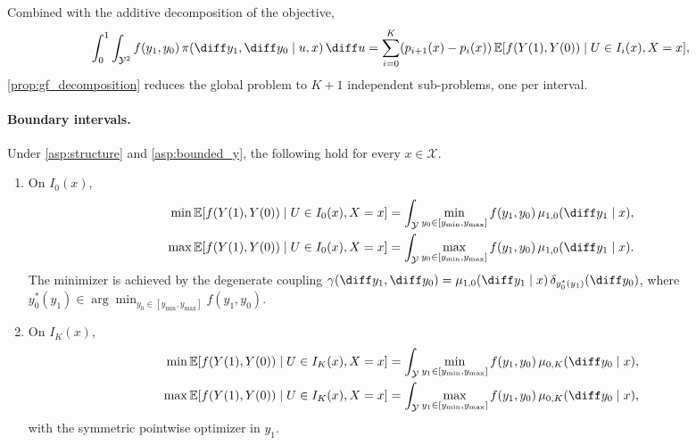 Combined with the additive decomposition of the objective,
\begin{equation}\label{eq:gf_obj_decomp}
    \int_0^1 \int_{\mathcal{Y}^2} f(y_1, y_0)\, \pi(\diff y_1, \diff y_0 \mid u, x)\, \diff u = \sum_{i=0}^{K} (p_{i+1}(x) - p_i(x))\, \mathbb{E}[f(Y(1), Y(0)) \mid U \in I_i(x), X = x],
\end{equation}
\cref{prop:gf_decomposition} reduces the global problem to $K + 1$ independent sub-problems, one per interval.

\paragraph{Boundary intervals.}

\begin{lemma}\label{lem:gf_boundary}
    Under \cref{asp:structure} and \cref{asp:bounded_y}, the following hold for every $x \in \mathcal{X}$.
    \begin{enumerate}
        \item[\textup{(i)}] On $I_0(x)$,
        \begin{align*}
            \min \mathbb{E}[f(Y(1), Y(0)) \mid U \in I_0(x), X = x]
                &= \int_{\mathcal{Y}} \min_{y_0 \in [y_{\min}, y_{\max}]} f(y_1, y_0)\, \mu_{1,0}(\diff y_1 \mid x),\\
            \max \mathbb{E}[f(Y(1), Y(0)) \mid U \in I_0(x), X = x]
                &= \int_{\mathcal{Y}} \max_{y_0 \in [y_{\min}, y_{\max}]} f(y_1, y_0)\, \mu_{1,0}(\diff y_1 \mid x).
        \end{align*}
        The minimizer is achieved by the degenerate coupling $\gamma(\diff y_1, \diff y_0) = \mu_{1,0}(\diff y_1 \mid x)\, \delta_{y_0^*(y_1)}(\diff y_0)$, where $y_0^*(y_1) \in \arg\min_{y_0 \in [y_{\min}, y_{\max}]} f(y_1, y_0)$.
        \item[\textup{(ii)}] On $I_K(x)$,
        \begin{align*}
            \min \mathbb{E}[f(Y(1), Y(0)) \mid U \in I_K(x), X = x]
                &= \int_{\mathcal{Y}} \min_{y_1 \in [y_{\min}, y_{\max}]} f(y_1, y_0)\, \mu_{0,K}(\diff y_0 \mid x),\\
            \max \mathbb{E}[f(Y(1), Y(0)) \mid U \in I_K(x), X = x]
                &= \int_{\mathcal{Y}} \max_{y_1 \in [y_{\min}, y_{\max}]} f(y_1, y_0)\, \mu_{0,K}(\diff y_0 \mid x),
        \end{align*}
        with the symmetric pointwise optimizer in $y_1$.
    \end{enumerate}
\end{lemma}

